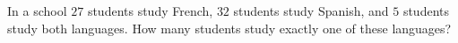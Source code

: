In a school $27$ students study French, $32$ students study Spanish, and $5$ students study both languages. How many students study exactly one of these languages?

